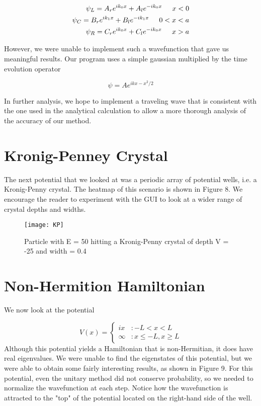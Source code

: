 \documentclass{article}
\begin{document}
\begin{align*}
\psi_L = A_r e^{ik_0x} + A_l e^{-ik_0x} \hspace{0.2in} x < 0 \\
\psi_C = B_r e^{ik_1x} + B_l e^{-ik_1x} \hspace{0.2in} 0 < x < a \\
\psi_R = C_r e^{ik_0x} + C_l e^{-ik_0x} \hspace{0.2in} x > a
\end{align*}

However, we were unable to implement such a wavefunction that gave us meaningful results. Our program uses a simple gaussian multiplied by the time evolution operator

\begin{equation}
\psi = A e^{ikx - x^2/2}
\end{equation}

In further analysis, we hope to implement a traveling wave that is consistent with the one used in the analytical calculation to allow a more thorough analysis of the accuracy of our method.

\section{Kronig-Penney Crystal}

The next potential that we looked at was a periodic array of potential wells, i.e. a Kronig-Penny crystal. The heatmap of this scenario is shown in Figure 8. We encourage the reader to experiment with the GUI to look at a wider range of crystal depths and widths. 


\begin{figure}
\centering
\texttt{[image: KP]}
\caption{ Particle with E = 50 hitting a Kronig-Penny crystal of depth V = -25 and width = 0.4 }
\end{figure}


\section{Non-Hermition Hamiltonian}

We now look at the potential 

\[V(x) = \left\{
  \begin{array}{lr}
    ix &  : -L < x  < L \\
    \infty & : x \leq -L , x \geq L 
  \end{array}
\right.
\]
%
Although this potential yields a Hamiltonian that is non-Hermitian, it does have real eigenvalues. We were unable to find
the eigenstates of this potential, but we were able to obtain some fairly interesting results, as shown in Figure 9. For this potential,
even the unitary method did not conserve probability, so we needed to normalize the wavefunction at each step. Notice how the wavefunction is
attracted to the "top" of the potential located on the right-hand side of the well.
\end{document}
